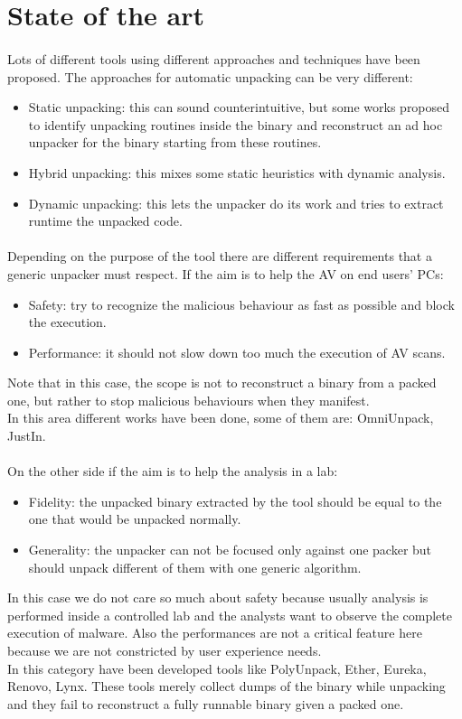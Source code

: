 \section{State of the art}
\paragraph{}
Lots of different tools using different approaches and techniques have been proposed. 
The approaches for automatic unpacking can be very different:
\begin{itemize}
\item Static unpacking: this can sound counterintuitive, but some works proposed to identify unpacking routines inside the binary and reconstruct an ad hoc unpacker for the binary starting from these routines.
\item Hybrid unpacking: this mixes some static heuristics with dynamic analysis.
\item Dynamic unpacking: this lets the unpacker do its work and tries to extract runtime the unpacked code. 
\end{itemize}
\paragraph{}
Depending on the purpose of the tool there are different requirements that a generic unpacker must respect. If the aim is to help the AV on end users' PCs:
\begin{itemize}
\item Safety: try to recognize the malicious behaviour as fast as possible and block the execution. 
\item Performance: it should not slow down too much the execution of AV scans.
\end{itemize}
Note that in this case, the scope is not to reconstruct a binary from a packed one, but rather to stop malicious behaviours when they manifest. \\
In this area different works have been done, some of them are: OmniUnpack, JustIn.
\paragraph{}
On the other side if the aim is to help the analysis in a lab:
\begin{itemize}
\item Fidelity: the unpacked binary extracted by the tool should be equal to the one that would be unpacked normally. 
\item Generality: the unpacker can not be focused only against one packer but should unpack different of them with one generic algorithm.
\end{itemize}
In this case we do not care so much about safety because usually analysis is performed inside a controlled lab and the analysts want to observe the complete execution of malware. Also the performances are not a critical feature here because we are not constricted by user experience needs.\\
In this category have been developed tools like PolyUnpack, Ether, Eureka, Renovo, Lynx.
These tools merely collect dumps of the binary while unpacking and they fail to reconstruct a fully runnable binary given a packed one.


